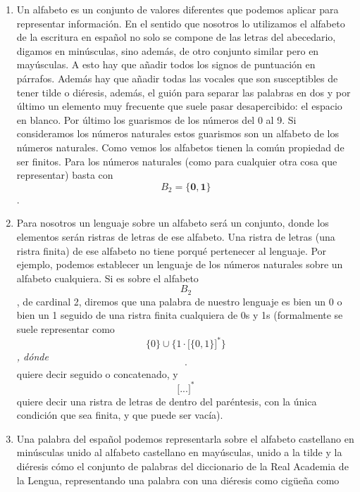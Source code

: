 \begin{enumerate}
  \begin{enumerate}
  \def\labelenumii{\arabic{enumii}.}
  \item
    Un alfabeto es un conjunto de valores diferentes que podemos aplicar
    para represen\-tar información. En el sentido que nosotros lo
    utilizamos el alfabeto de la escritura en español no solo se compone
    de las letras del abecedario, digamos en minúsculas, sino además, de
    otro conjunto similar pero en mayúsculas. A esto hay que añadir
    todos los signos de puntuación en párrafos. Además hay que añadir
    todas las vocales que son susceptibles de tener tilde o diéresis,
    además, el guión para separar las palabras en dos y por último un
    elemento muy frecuente que suele pasar desapercibido: el espa\-cio
    en blanco. Por último los guarismos de los números del 0 al 9. Si
    consideramos los números naturales estos guarismos son un alfabeto
    de los números naturales. Como vemos los alfabetos tienen la común
    propiedad de ser finitos. Para los núme\-ros naturales (como para
    cualquier otra cosa que representar) basta con
    \[B_{\mathbf{\mathrm{2}}} = {\{{\mathbf{0,}\mathbf{1}}\}}\] .
  \item
    Para nosotros un lenguaje sobre un alfabeto será un conjunto, donde
    los elementos serán ristras de letras de ese alfabeto. Una ristra de
    letras (una ristra finita) de ese al\-fabeto no tiene porqué
    pertenecer al lenguaje. Por ejemplo, podemos establecer un lenguaje
    de los números naturales sobre un alfabeto cualquiera. Si es sobre
    el alfabe\-to \[B_{\mathbf{\mathrm{2}}}\], de cardinal 2, diremos
    que una palabra de nuestro lenguaje es bien un 0 o bien un 1 seguido
    de una ristra finita cualquiera de 0s y 1s (formalmente se suele
    re\-presentar como
    \[{\{ 0\}} \cup {\{{1 \cdot {\lbrack{\{ 0,1\}}\rbrack}^{\ast}}\}}\]\emph{,
    dónde \textquotesingle{}\[\cdot\]\textquotesingle{}} quiere decir
    seguido o conca\-tenado, y
    \textquotesingle\textquotesingle{}\[{\lbrack...\rbrack}^{\ast}\]\textquotesingle\textquotesingle{}
    quiere decir una ristra de letras de dentro del paréntesis, con la
    única condición que sea finita, y que puede ser vacía).
  \item
    Una palabra del español podemos representarla sobre el alfabeto
    castellano en minús\-culas unido al alfabeto castellano en
    mayúsculas, unido a la tilde y la diéresis cómo el conjunto de
    palabras del diccionario de la Real Academia de la Lengua,
    represen\-tando una palabra con una diéresis como cigüeña como

\end{enumerate}
\end{enumerate}
